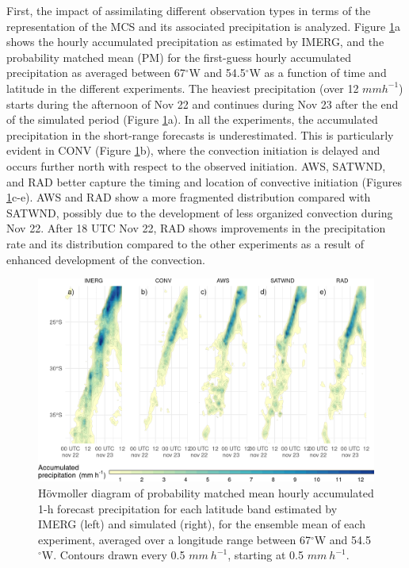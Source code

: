 \documentclass[preprint, 3p, authoryear,review, 12pt]{elsarticle} %
\begin{document}
First, the impact of assimilating different observation types in terms of the representation of the MCS and its associated precipitation is analyzed. Figure \ref{fig:pp-hov}a shows the hourly accumulated precipitation as estimated by IMERG, and the probability matched mean (PM) \citep{clark2017} for the first-guess hourly accumulated precipitation as averaged between 67\(^{\circ}\)W and 54.5\(^{\circ}\)W as a function of time and latitude in the different experiments. The heaviest precipitation (over 12 \(mmh^{-1}\)) starts during the afternoon of Nov 22 and continues during Nov 23 after the end of the simulated period (Figure \ref{fig:pp-hov}a). In all the experiments, the accumulated precipitation in the short-range forecasts is underestimated. This is particularly evident in CONV (Figure \ref{fig:pp-hov}b), where the convection initiation is delayed and occurs further north with respect to the observed initiation. AWS, SATWND, and RAD better capture the timing and location of convective initiation (Figures \ref{fig:pp-hov}c-e). AWS and RAD show a more fragmented distribution compared with SATWND, possibly due to the development of less organized convection during Nov 22. After 18 UTC Nov 22, RAD shows improvements in the precipitation rate and its distribution compared to the other experiments as a result of enhanced development of the convection.



\begin{figure}[h]

{\centering \includegraphics{../figures/pp-hov-1} 

}

\caption{Hövmoller diagram of probability matched mean hourly accumulated 1-h forecast precipitation for each latitude band estimated by IMERG (left) and simulated (right), for the ensemble mean of each experiment, averaged over a longitude range between 67\(^{\circ}\)W and 54.5\(^{\circ}\)W. Contours drawn every 0.5 \(mm\ h^{-1}\), starting at 0.5 \(mm\ h^{-1}\).}\label{fig:pp-hov}
\end{figure}
\end{document}
